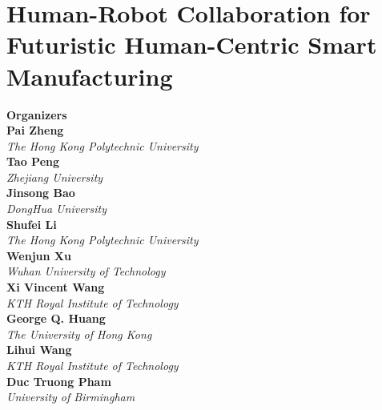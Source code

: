 \section{Human-Robot Collaboration for Futuristic Human-Centric Smart Manufacturing}


\large \textbf{Organizers} \normalsize \vspace{2mm} \\
\textbf{Pai  Zheng} \\ 
\textit{The Hong Kong Polytechnic University} \vspace{{2mm}} \\
\textbf{Tao  Peng} \\ 
\textit{Zhejiang University} \vspace{{2mm}} \\
\textbf{Jinsong  Bao} \\ 
\textit{DongHua University} \vspace{{2mm}} \\
\textbf{Shufei  Li} \\ 
\textit{The Hong Kong Polytechnic University} \vspace{{2mm}} \\
\textbf{Wenjun  Xu} \\ 
\textit{Wuhan University of Technology} \vspace{{2mm}} \\
\textbf{Xi Vincent  Wang} \\ 
\textit{KTH Royal Institute of Technology} \vspace{{2mm}} \\
\textbf{George Q.  Huang} \\ 
\textit{The University of Hong Kong} \vspace{{2mm}} \\
\textbf{Lihui  Wang} \\ 
\textit{KTH Royal Institute of Technology} \vspace{{2mm}} \\
\textbf{Duc Truong  Pham} \\ 
\textit{University of Birmingham}

